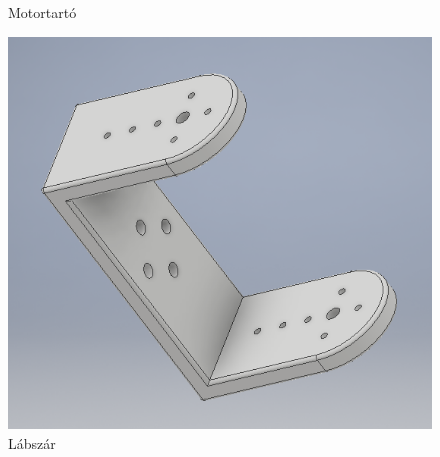\documentclass{article}
\begin{document}
\begin{figure}
\begin{minipage}{0.3\textwidth}
		\caption{Motortartó}
	\end{minipage}\hfill
	\begin{minipage}{0.3\textwidth}
		\centering
		\includegraphics[width=\textwidth]{labszar}
		\caption{Lábszár}
	\end{minipage}
\end{figure}
\end{document}
